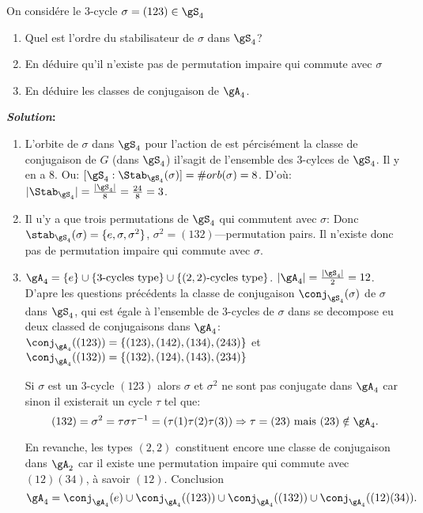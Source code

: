 \begin{exercise}

	On considére le 3-cycle $\sigma=(123)\in\gS_4$
	\begin{enumerate}
		\item Quel est l'ordre du stabilisateur de $\sigma$ dans $\gS_4$?
		\item En déduire qu'il n'existe pas de permutation impaire qui commute avec $\sigma$
		\item En déduire les classes de conjugaison de $\gA_4$.
	\end{enumerate}

	\textbf{\emph{Solution}:}

	\begin{enumerate}

		\item L'orbite de $\sigma$ dans $\gS_4$ pour l'action de est pércisément la classe de conjugaison de $G$ (dans $\gS_4$) il'sagit de l'ensemble des 3-cylces de $\gS_4$. Il y en a 8. Ou: $[\gS_4: \Stab_{\gS_4}(\sigma)]=\#orb(\sigma)=8$. D'où: $|\Stab_{\gS_4}|=\frac{|\gS_4|}{8}=\frac{24}{8}=3$.

		\item Il u'y a que trois permutations de $\gS_4$ qui commutent avec $\sigma$: Donc $\stab_{\gS_4}(\sigma)=\{e,\sigma,\sigma^2\}$, $\sigma^2=(132)$---permutation pairs. Il n'existe donc pas de permutation impaire qui commute avec $\sigma$.

		\item $\gA_4=\{e\}\cup\{3\text{-cycles type}\}\cup\{(2,2)\text{-cycles type}\}$. $|\gA_4|=\frac{|\gS_4|}2=12$.
		D'apre les questions précédents la classe de conjugaison $\conj_{\gS_4}(\sigma)$ de $\sigma$ dans $\gS_4$, qui est égale à l'ensemble de 3-cycles de $\sigma$ dans se decompose eu deux classed de conjugaisons dans $\gA_4$:\\ $\conj_{\gA_4}((123))=\{(123), (142), (134), (243)\}$ et\\$\conj_{\gA_4}((132))=\{(132), (124), (143), (234)\}$


		\begin{remark}
			Si $\sigma$ est un 3-cycle $(123)$ alors $\sigma$ et $\sigma^2$ ne sont pas conjugate dans $\gA_4$ car sinon il existerait un cycle $\tau$ tel que:
			$$(132)=\sigma^2=\tau\sigma\tau^{-1}=(\tau(1)\tau(2)\tau(3)) \Rightarrow \tau=(23) \mbox{ mais } (23)\notin \gA_4.$$
		\end{remark}


		En revanche, les types $(2,2)$ constituent encore une classe de conjugaison dans $\gA_2$ car il existe une permutation impaire qui commute avec $(12)(34)$, à savoir $(12)$. Conclusion $$\gA_4=\conj_{\gA_4}(e)\cup \conj_{\gA_4}((123))\cup \conj_{\gA_4}((132))\cup \conj_{\gA_4}((12)(34)).$$


\end{enumerate}
\end{exercise}
